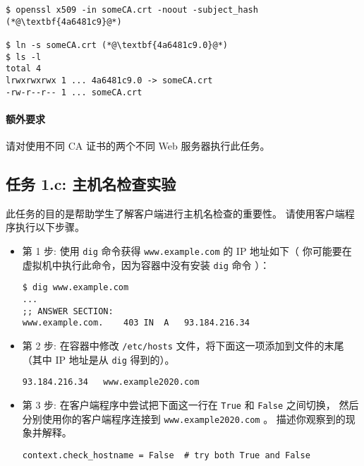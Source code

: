 \begin{lstlisting}
$ openssl x509 -in someCA.crt -noout -subject_hash
(*@\textbf{4a6481c9}@*)

$ ln -s someCA.crt (*@\textbf{4a6481c9.0}@*)
$ ls -l
total 4
lrwxrwxrwx 1 ... 4a6481c9.0 -> someCA.crt
-rw-r--r-- 1 ... someCA.crt
\end{lstlisting}


\paragraph{额外要求} 请对使用不同 CA 证书的两个不同 Web 服务器执行此任务。


\subsection{任务 1.c: 主机名检查实验}

此任务的目的是帮助学生了解客户端进行主机名检查的重要性。
请使用客户端程序执行以下步骤。


\begin{itemize}
\item 第 1 步: 使用 \texttt{dig} 命令获得 \texttt{www.example.com} 的 IP 地址如下（
你可能要在虚拟机中执行此命令，因为容器中没有安装 \texttt{dig} 命令
）：

\begin{lstlisting}
$ dig www.example.com
...
;; ANSWER SECTION:
www.example.com.	403	IN	A	93.184.216.34
\end{lstlisting}


\item 第 2 步: 在容器中修改 \texttt{/etc/hosts} 文件，将下面这一项添加到文件的末尾
（其中 IP 地址是从 \texttt{dig} 得到的）。

\begin{lstlisting}
93.184.216.34   www.example2020.com
\end{lstlisting}


\item 第 3 步:
在客户端程序中尝试把下面这一行在 \texttt{True} 和 \texttt{False} 之间切换，
然后分别使用你的客户端程序连接到 \texttt{www.example2020.com} 。
描述你观察到的现象并解释。

\begin{lstlisting}
context.check_hostname = False  # try both True and False
\end{lstlisting}
\end{itemize}


